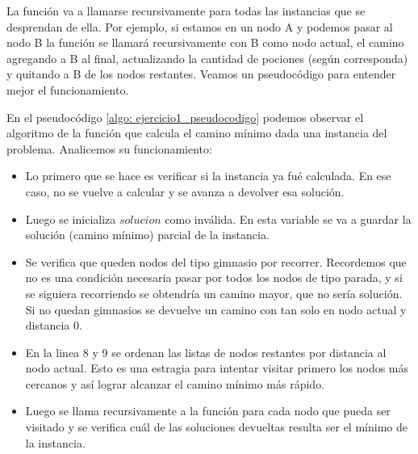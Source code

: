 \par La función va a llamarse recursivamente para todas las instancias que se desprendan de ella. Por ejemplo, si estamos en un nodo A y podemos pasar al nodo B la función se llamará recursivamente con B como nodo actual, el camino agregando a B al final, actualizando la cantidad de pociones (según corresponda) y quitando a B de los nodos restantes. Veamos un pseudocódigo para entender mejor el funcionamiento.

\par En el pseudocódigo \ref{algo: ejercicio1_pseudocodigo} podemos observar el algoritmo de la función que calcula el camino mínimo dada una instancia del problema. Analicemos su funcionamiento:

\begin{itemize}
	\item Lo primero que se hace es verificar si la instancia ya fué calculada. En ese caso, no se vuelve a calcular y se avanza a devolver esa solución.
	\item Luego se inicializa $solucion$ como inválida. En esta variable se va a guardar la solución (camino mínimo) parcial de la instancia.
	\item Se verifica que queden nodos del tipo gimnasio por recorrer. Recordemos que no es una condición necesaria pasar por todos los nodos de tipo parada, y si se siguiera recorriendo se obtendría un camino mayor, que no sería solución. Si no quedan gimnasios se devuelve un camino con tan solo en nodo actual y distancia 0.
	\item En la linea 8 y 9 se ordenan las listas de nodos restantes por distancia al nodo actual. Esto es una estragia para intentar visitar primero los nodos más cercanos y así lograr alcanzar el camino mínimo más rápido.
	\item Luego se llama recursivamente a la función para cada nodo que pueda ser visitado y se verifica cuál de las soluciones devueltas resulta ser el mínimo de la instancia.
\end{itemize}

\medskip

